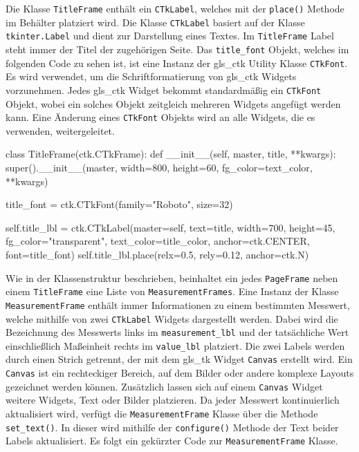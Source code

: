 Die Klasse \lstinline{TitleFrame} enthält ein \lstinline{CTkLabel}, welches mit der \lstinline{place()} Methode im Behälter platziert wird. Die Klasse \lstinline{CTkLabel} basiert auf der Klasse \lstinline{tkinter.Label} und dient zur Darstellung eines Textes. Im \lstinline{TitleFrame} Label steht immer der Titel der zugehörigen Seite. Das \lstinline{title_font} Objekt, welches im folgenden Code zu sehen ist, ist eine Instanz der \gls{gls_ctk} Utility Klasse \lstinline{CTkFont}. Es wird verwendet, um die Schriftformatierung von \gls{gls_ctk} Widgets vorzunehmen. Jedes \gls{gls_ctk} Widget bekommt standardmäßig ein \lstinline{CTkFont} Objekt, wobei ein solches Objekt zeitgleich mehreren Widgets angefügt werden kann. Eine Änderung eines \lstinline{CTkFont} Objekts wird an alle Widgets, die es verwenden, weitergeleitet. \cite[vgl.][]{Schimansky:o.J.}

\begin{pythoncode}
class TitleFrame(ctk.CTkFrame):
	def __init__(self, master, title, **kwargs):
		super().__init__(master, width=800, height=60, fg_color=text_color, **kwargs)
		
		title_font = ctk.CTkFont(family="Roboto", size=32)
		
		self.title_lbl = ctk.CTkLabel(master=self, text=title, width=700, height=45, fg_color="transparent", text_color=title_color, anchor=ctk.CENTER, font=title_font)
		self.title_lbl.place(relx=0.5, rely=0.12, anchor=ctk.N)
\end{pythoncode}


Wie in der Klassenstruktur beschrieben, beinhaltet ein jedes \lstinline{PageFrame} neben einem \lstinline{TitleFrame} eine Liste von \lstinline{MeasurementFrames}. Eine Instanz der Klasse \lstinline{MeasurementFrame} enthält immer Informationen zu einem bestimmten Messwert, welche mithilfe von zwei \lstinline{CTkLabel} Widgets dargestellt werden. Dabei wird die Bezeichnung des Messwerts links im \lstinline{measurement_lbl} und der tatsächliche Wert einschließlich Maßeinheit rechts im \lstinline{value_lbl} platziert. Die zwei Labels werden durch einen Strich getrennt, der mit dem \gls{gls_tk} Widget \lstinline{Canvas} erstellt wird. Ein \lstinline{Canvas} ist ein rechteckiger Bereich, auf dem Bilder oder andere komplexe Layouts gezeichnet werden können. Zusätzlich lassen sich auf einem \lstinline{Canvas} Widget \zB weitere Widgets, Text oder Bilder platzieren. \cite[vgl.][20]{Shipman:2013} 
\newline Da jeder Messwert kontinuierlich aktualisiert wird, verfügt die \lstinline{MeasurementFrame} Klasse über die Methode \lstinline{set_text()}. In dieser wird mithilfe der \lstinline{configure()} Methode der Text beider Labels aktualisiert. Es folgt ein gekürzter Code zur \lstinline{MeasurementFrame} Klasse.

